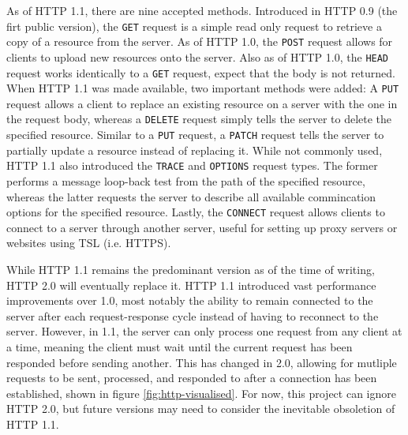 \documentclass[11pt]{article}
\begin{document}
As of HTTP 1.1, there are nine accepted methods. Introduced in HTTP 0.9 (the firt public version), the \texttt{GET} request is a simple read only request to retrieve a copy of a resource from the server. As of HTTP 1.0, the \texttt{POST} request allows for clients to upload new resources onto the server. Also as of HTTP 1.0, the \texttt{HEAD} request works identically to a \texttt{GET} request, expect that the body is not returned. When HTTP 1.1 was made available, two important methods were added: A \texttt{PUT} request allows a client to replace an existing resource on a server with the one in the request body, whereas a \texttt{DELETE} request simply tells the server to delete the specified resource. Similar to a \texttt{PUT} request, a \texttt{PATCH} request tells the server to partially update a resource instead of replacing it. While not commonly used, HTTP 1.1 also introduced the \texttt{TRACE} and \texttt{OPTIONS} request types. The former performs a message loop-back test from the path of the specified resource, whereas the latter requests the server to describe all available commincation options for the specified resource. Lastly, the \texttt{CONNECT} request allows clients to connect to a server through another server, useful for setting up proxy servers or websites using TSL (i.e. HTTPS).

While HTTP 1.1 remains the predominant version as of the time of writing, HTTP 2.0 will eventually replace it. HTTP 1.1 introduced vast performance improvements over 1.0, most notably the ability to remain connected to the server after each request-response cycle instead of having to reconnect to the server. However, in 1.1, the server can only process one request from any client at a time, meaning the client must wait until the current request has been responded before sending another. This has changed in 2.0, allowing for mutliple requests to be sent, processed, and responded to after a connection has been established, shown in figure \ref{fig:http-visualised}. For now, this project can ignore HTTP 2.0, but future versions may need to consider the inevitable obsoletion of HTTP 1.1.
\end{document}
